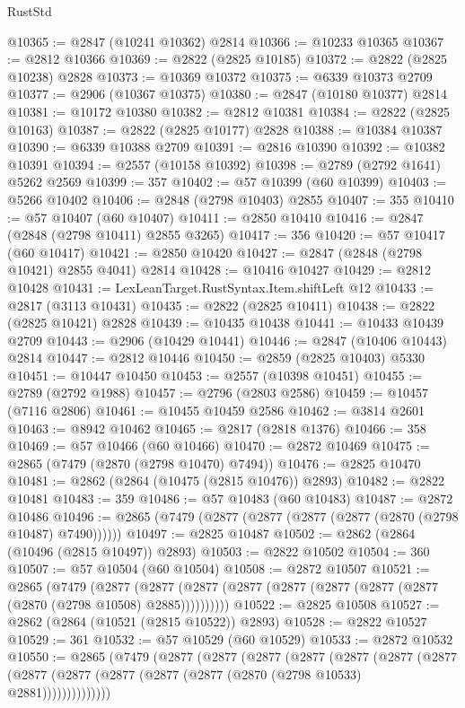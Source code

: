\begin{lexlean}{RustStd}
\begin{coremodule}
@10365 := @2847 (@10241 @10362) @2814
@10366 := @10233 @10365
@10367 := @2812 @10366
@10369 := @2822 (@2825 @10185)
@10372 := @2822 (@2825 @10238) @2828
@10373 := @10369 @10372
@10375 := @6339 @10373 @2709
@10377 := @2906 (@10367 @10375)
@10380 := @2847 (@10180 @10377) @2814
@10381 := @10172 @10380
@10382 := @2812 @10381
@10384 := @2822 (@2825 @10163)
@10387 := @2822 (@2825 @10177) @2828
@10388 := @10384 @10387
@10390 := @6339 @10388 @2709
@10391 := @2816 @10390
@10392 := @10382 @10391
@10394 := @2557 (@10158 @10392)
@10398 := @2789 (@2792 @1641) @5262 @2569
@10399 := 357
@10402 := @57 @10399 (@60 @10399)
@10403 := @5266 @10402
@10406 := @2848 (@2798 @10403) @2855
@10407 := 355
@10410 := @57 @10407 (@60 @10407)
@10411 := @2850 @10410
@10416 := @2847 (@2848 (@2798 @10411) @2855 @3265)
@10417 := 356
@10420 := @57 @10417 (@60 @10417)
@10421 := @2850 @10420
@10427 := @2847 (@2848 (@2798 @10421) @2855 @4041) @2814
@10428 := @10416 @10427
@10429 := @2812 @10428
@10431 := LexLeanTarget.RustSyntax.Item.shiftLeft @12
@10433 := @2817 (@3113 @10431)
@10435 := @2822 (@2825 @10411)
@10438 := @2822 (@2825 @10421) @2828
@10439 := @10435 @10438
@10441 := @10433 @10439 @2709
@10443 := @2906 (@10429 @10441)
@10446 := @2847 (@10406 @10443) @2814
@10447 := @2812 @10446
@10450 := @2859 (@2825 @10403) @5330
@10451 := @10447 @10450
@10453 := @2557 (@10398 @10451)
@10455 := @2789 (@2792 @1988)
@10457 := @2796 (@2803 @2586)
@10459 := @10457 (@7116 @2806)
@10461 := @10455 @10459 @2586
@10462 := @3814 @2601
@10463 := @8942 @10462
@10465 := @2817 (@2818 @1376)
@10466 := 358
@10469 := @57 @10466 (@60 @10466)
@10470 := @2872 @10469
@10475 := @2865 (@7479 (@2870 (@2798 @10470) @7494))
@10476 := @2825 @10470
@10481 := @2862 (@2864 (@10475 (@2815 @10476)) @2893)
@10482 := @2822 @10481
@10483 := 359
@10486 := @57 @10483 (@60 @10483)
@10487 := @2872 @10486
@10496 := @2865 (@7479 (@2877 (@2877 (@2877 (@2877 (@2870 (@2798 @10487) @7490))))))
@10497 := @2825 @10487
@10502 := @2862 (@2864 (@10496 (@2815 @10497)) @2893)
@10503 := @2822 @10502
@10504 := 360
@10507 := @57 @10504 (@60 @10504)
@10508 := @2872 @10507
@10521 := @2865
    (@7479
      (@2877 (@2877 (@2877 (@2877 (@2877 (@2877 (@2877 (@2877 (@2870 (@2798 @10508) @2885))))))))))
@10522 := @2825 @10508
@10527 := @2862 (@2864 (@10521 (@2815 @10522)) @2893)
@10528 := @2822 @10527
@10529 := 361
@10532 := @57 @10529 (@60 @10529)
@10533 := @2872 @10532
@10550 := @2865
    (@7479
      (@2877
        (@2877
          (@2877
            (@2877
              (@2877
                (@2877
                  (@2877
                    (@2877 (@2877 (@2877 (@2877 (@2877 (@2870 (@2798 @10533) @2881))))))))))))))

\end{coremodule}
\end{lexlean}
